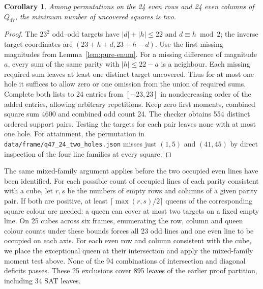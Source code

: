 \documentclass[11pt]{article}
\newtheorem{corollary}[theorem]{Corollary}
\newcommand{\file}[1]{\nolinkurl{#1}}
\begin{document}
\begin{corollary}\label{cor:twoholes}
Among permutations on the 24 even rows and 24 even columns of $Q_{47}$,
the minimum number of uncovered squares is two.
\end{corollary}
\begin{proof}
The $23^2$ odd--odd targets have $|d|+|h|\le22$ and $d\equiv h\bmod2$;
the inverse target coordinates are $(23+h+d,23+h-d)$.
Use the first missing magnitudes from Lemma~\ref{lem:pure-enum}. For a
missing difference of magnitude $a$, every sum of the same parity with
$|h|\le22-a$ is a neighbour. Each missing required sum leaves at least
one distinct target uncovered. Thus for at most one hole it suffices to
allow zero or one omission from the union of required sums. Complete
both lists to 24 entries from $[-23,23]$ in nondecreasing order of the
added entries, allowing arbitrary repetitions. Keep zero first moments,
combined square sum 4600 and combined odd count 24. The checker obtains
554 distinct ordered support pairs. Testing the targets for each pair
leaves none with at most one hole. For attainment, the permutation in
\file{data/frame/q47_24_two_holes.json} misses just $(1,5)$ and $(41,45)$
by direct inspection of the four line families at every square.
\end{proof}

The same mixed-family argument applies before the two occupied even
lines have been identified. For each possible count of occupied lines
of each parity consistent with a cube, let $r,s$ be the numbers of empty
rows and columns of a given parity pair. If both are positive, at least
$\lceil\max(r,s)/2\rceil$ queens of the corresponding square colour
are needed: a queen can cover at most two targets on a fixed empty line.
On 25 cubes across six frames, enumerating the row, column and queen
colour counts under these bounds forces all 23 odd lines and one even
line to be occupied on each axis. For each even row and column consistent
with the cube, we place the exceptional queen at their intersection and
apply the mixed-family moment test above. None of the 94 combinations of
intersection and diagonal deficits passes. These 25 exclusions cover
895 leaves of the earlier proof partition, including 34 SAT leaves.
\end{document}
